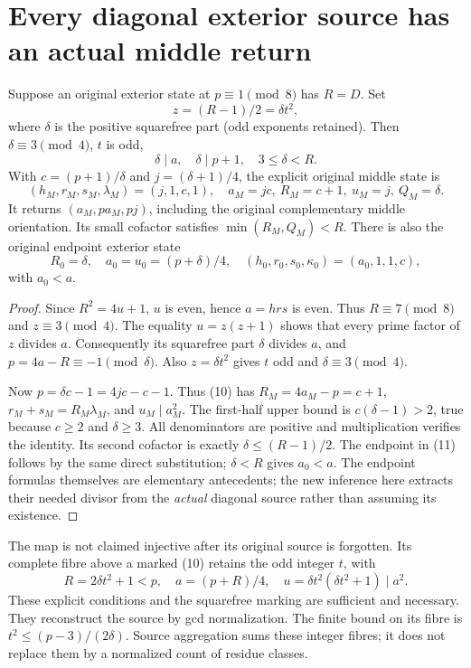\section{Every diagonal exterior source has an actual middle return}
\begin{theorem}\label{thm:collision}
Suppose an original exterior state at $p\equiv1\pmod8$ has $R=D$.
Set
\[
 z=(R-1)/2=\delta t^2,
\]
where $\delta$ is the positive squarefree part (odd exponents retained).
Then $\delta\equiv3\pmod4$, $t$ is odd,
\[
 \delta\mid a,\quad \delta\mid p+1,\quad 3\le\delta<R.
\]
With $c=(p+1)/\delta$ and $j=(\delta+1)/4$, the explicit original middle state is
\[
 \boxed{(h_M,r_M,s_M,\lambda_M)=(j,1,c,1),\quad
 a_M=jc,\ R_M=c+1,\ u_M=j,\ Q_M=\delta.}                 \tag{10}
\]
It returns $(a_M,pa_M,pj)$, including the original complementary middle
orientation. Its small cofactor satisfies $\min(R_M,Q_M)<R$.
There is also the original endpoint exterior state
\[
 R_0=\delta,\quad a_0=u_0=(p+\delta)/4,\quad
 (h_0,r_0,s_0,\kappa_0)=(a_0,1,1,c),                    \tag{11}
\]
with $a_0<a$.
\end{theorem}
\begin{proof}
Since $R^2=4u+1$, $u$ is even, hence $a=hrs$ is even. Thus $R\equiv7\pmod8$
and $z\equiv3\pmod4$. The equality $u=z(z+1)$ shows that every prime factor of
$z$ divides $a$. Consequently its squarefree part $\delta$ divides $a$, and
$p=4a-R\equiv-1\pmod\delta$. Also $z=\delta t^2$ gives $t$ odd and
$\delta\equiv3\pmod4$.

Now $p=\delta c-1=4jc-c-1$. Thus (10) has $R_M=4a_M-p=c+1$,
$r_M+s_M=R_M\lambda_M$, and $u_M\mid a_M^2$.
The first-half upper bound is $c(\delta-1)>2$, true because $c\ge2$ and
$\delta\ge3$. All denominators are positive and multiplication verifies the
identity. Its second cofactor is exactly $\delta\le(R-1)/2$.
The endpoint in (11) follows by the same direct substitution; $\delta<R$
gives $a_0<a$. The endpoint formulas themselves are elementary antecedents;
the new inference here extracts their needed divisor from the \emph{actual}
diagonal source rather than assuming its existence.
\end{proof}

The map is not claimed injective after its original source is forgotten.
Its complete fibre above a marked (10) retains the odd integer $t$, with
\[
 R=2\delta t^2+1<p,\quad a=(p+R)/4,\quad
 u=\delta t^2(\delta t^2+1)\mid a^2.                      \tag{12}
\]
These explicit conditions and the squarefree marking are sufficient and necessary.
They reconstruct the source by gcd normalization. The finite bound on its fibre is
$t^2\le(p-3)/(2\delta)$. Source aggregation sums these integer fibres; it does
not replace them by a normalized count of residue classes.

